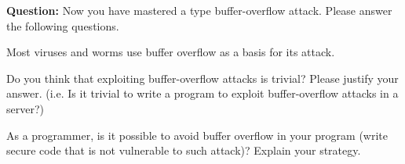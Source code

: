 \documentclass[a4paper, 10pt]{article}
\begin{document}


\begin{problem}
\textbf{Question:} Now you have mastered a type buffer-overflow attack.
Please answer the following questions.

\begin{subproblems}
	\item Most viruses and worms use buffer overflow as a basis for its attack.
	\item Do you think that exploiting buffer-overflow attacks is trivial?
				Please justify your answer.
				(i.e. Is it trivial to write a program to exploit buffer-overflow attacks in a server?)
	\item As a programmer, is it possible to avoid buffer overflow in your program
				(write secure code that is not vulnerable to such attack)?
				Explain your strategy.
\end{subproblems}
\end{problem}
\end{document}
